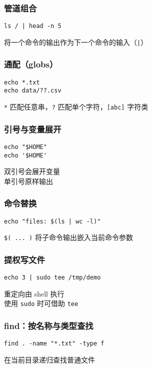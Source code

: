 \documentclass[a4paper,12pt]{ctexart}
\begin{document}
\subsubsection{管道组合}
\begin{lstlisting}
ls / | head -n 5
\end{lstlisting}
将一个命令的输出作为下一个命令的输入（\texttt{|}）

\subsubsection{通配（globs）}
\begin{lstlisting}
echo *.txt
echo data/??.csv
\end{lstlisting}
\texttt{*} 匹配任意串，\texttt{?} 匹配单个字符，\texttt{[abc]} 字符类

\subsubsection{引号与变量展开}
\begin{lstlisting}
echo "$HOME"
echo '$HOME'
\end{lstlisting}
双引号会展开变量 \\ 单引号原样输出

\subsubsection{命令替换}
\begin{lstlisting}
echo "files: $(ls | wc -l)"
\end{lstlisting}
\texttt{\$( ... )} 将子命令输出嵌入当前命令参数

\subsubsection{提权写文件}
\begin{lstlisting}
echo 3 | sudo tee /tmp/demo
\end{lstlisting}
重定向由 shell 执行 \\ 使用 \texttt{sudo} 时可借助 \texttt{tee}

\subsubsection{find：按名称与类型查找}
\begin{lstlisting}
find . -name "*.txt" -type f
\end{lstlisting}
在当前目录递归查找普通文件
\end{document}
